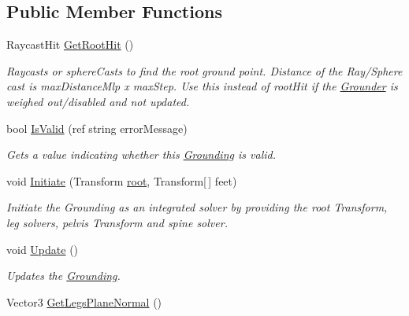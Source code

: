 \subsection*{Public Member Functions}
\begin{DoxyCompactItemize}
\item 
Raycast\+Hit \mbox{\hyperlink{class_root_motion_1_1_final_i_k_1_1_grounding_a02348168fa9773f73b8697f82dae16e8}{Get\+Root\+Hit}} ()
\begin{DoxyCompactList}\small\item\em Raycasts or sphere\+Casts to find the root ground point. Distance of the Ray/\+Sphere cast is max\+Distance\+Mlp x max\+Step. Use this instead of root\+Hit if the \mbox{\hyperlink{class_root_motion_1_1_final_i_k_1_1_grounder}{Grounder}} is weighed out/disabled and not updated. \end{DoxyCompactList}\item 
bool \mbox{\hyperlink{class_root_motion_1_1_final_i_k_1_1_grounding_a2b6b9e638c676660bf7bd03bc08b4e72}{Is\+Valid}} (ref string error\+Message)
\begin{DoxyCompactList}\small\item\em Gets a value indicating whether this \mbox{\hyperlink{class_root_motion_1_1_final_i_k_1_1_grounding}{Grounding}} is valid. \end{DoxyCompactList}\item 
void \mbox{\hyperlink{class_root_motion_1_1_final_i_k_1_1_grounding_a2e0c3b799348ec458e5049b7ed3a1969}{Initiate}} (Transform \mbox{\hyperlink{class_root_motion_1_1_final_i_k_1_1_grounding_a68b68c68d458cacdea714b642ad0a301}{root}}, Transform\mbox{[}$\,$\mbox{]} feet)
\begin{DoxyCompactList}\small\item\em Initiate the Grounding as an integrated solver by providing the root Transform, leg solvers, pelvis Transform and spine solver. \end{DoxyCompactList}\item 
void \mbox{\hyperlink{class_root_motion_1_1_final_i_k_1_1_grounding_a2bfc57bd6ff66360926b637e167b6b53}{Update}} ()
\begin{DoxyCompactList}\small\item\em Updates the \mbox{\hyperlink{class_root_motion_1_1_final_i_k_1_1_grounding}{Grounding}}. \end{DoxyCompactList}\item 
Vector3 \mbox{\hyperlink{class_root_motion_1_1_final_i_k_1_1_grounding_a4a3a6ca205a863d2eb17e817f173da25}{Get\+Legs\+Plane\+Normal}} ()

\end{DoxyCompactItemize}
